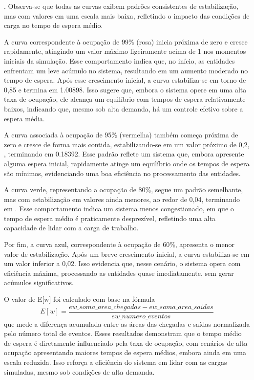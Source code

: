 . Observa-se que todas as curvas exibem padrões consistentes de estabilização, mas com valores em uma escala mais baixa, refletindo o impacto das condições de carga no tempo de espera médio.

A curva correspondente à ocupação de 99\% (rosa) inicia próxima de zero e cresce rapidamente, atingindo um valor máximo ligeiramente acima de 1 nos momentos iniciais da simulação. Esse comportamento indica que, no início, as entidades enfrentam um leve acúmulo no sistema, resultando em um aumento moderado no tempo de espera. Após esse crescimento inicial, a curva estabiliza-se em torno de 0,85 e termina em 1.00898. Isso sugere que, embora o sistema opere em uma alta taxa de ocupação, ele alcança um equilíbrio com tempos de espera relativamente baixos, indicando que, mesmo sob alta demanda, há um controle efetivo sobre a espera média.

A curva associada à ocupação de 95\% (vermelha) também começa próxima de zero e cresce de forma mais contida, estabilizando-se em um valor próximo de 0,2, , terminando em 0.18392. Esse padrão reflete um sistema que, embora apresente alguma espera inicial, rapidamente atinge um equilíbrio onde os tempos de espera são mínimos, evidenciando uma boa eficiência no processamento das entidades.

A curva verde, representando a ocupação de 80\%, segue um padrão semelhante, mas com estabilização em valores ainda menores, ao redor de 0,04, terminando em . Esse comportamento indica um sistema menos congestionado, em que o tempo de espera médio é praticamente desprezível, refletindo uma alta capacidade de lidar com a carga de trabalho.

Por fim, a curva azul, correspondente à ocupação de 60\%, apresenta o menor valor de estabilização. Após um breve crescimento inicial, a curva estabiliza-se em um valor inferior a 0,02. Isso evidencia que, nesse cenário, o sistema opera com eficiência máxima, processando as entidades quase imediatamente, sem gerar acúmulos significativos.

O valor de E[w] foi calculado com base na fórmula 
$$
E[w] = \frac{ew\_soma\_area\_chegadas-ew\_soma\_area\_saidas}{ew\_numero\_eventos}
$$
que mede a diferença acumulada entre as áreas das chegadas e saídas normalizada pelo número total de eventos. Esses resultados demonstram que o tempo médio de espera é diretamente influenciado pela taxa de ocupação, com cenários de alta ocupação apresentando maiores tempos de espera médios, embora ainda em uma escala reduzida. Isso reforça a eficiência do sistema em lidar com as cargas simuladas, mesmo sob condições de alta demanda.

